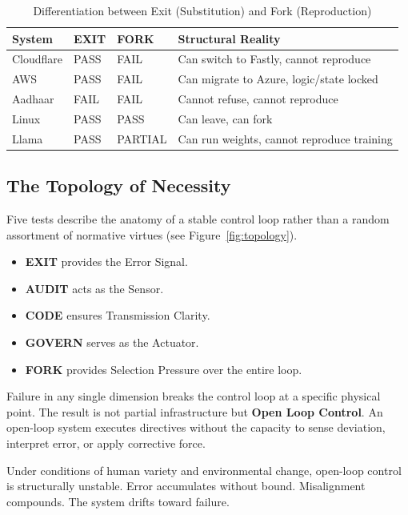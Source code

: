 \documentclass{article}
\begin{document}
\begin{table}[htbp]
\centering
\begin{tabular}{@{}lllp{5.5cm}@{}}
\toprule
\textbf{System} & \textbf{EXIT} & \textbf{FORK} & \textbf{Structural Reality} \\
\midrule
Cloudflare & PASS & FAIL & Can switch to Fastly, cannot reproduce \\
AWS & PASS & FAIL & Can migrate to Azure, logic/state locked \\
Aadhaar & FAIL & FAIL & Cannot refuse, cannot reproduce \\
Linux & PASS & PASS & Can leave, can fork \\
Llama & PASS & PARTIAL & Can run weights, cannot reproduce training \\
\bottomrule
\end{tabular}
\caption{Differentiation between Exit (Substitution) and Fork (Reproduction)}
\end{table}

\subsection{The Topology of Necessity}

Five tests describe the anatomy of a stable control loop rather than a random assortment of normative virtues (see Figure~\ref{fig:topology}).

\begin{itemize}[noitemsep,topsep=0pt]
    \item \textbf{EXIT} provides the Error Signal.
    \item \textbf{AUDIT} acts as the Sensor.
    \item \textbf{CODE} ensures Transmission Clarity.
    \item \textbf{GOVERN} serves as the Actuator.
    \item \textbf{FORK} provides Selection Pressure over the entire loop.
\end{itemize}

Failure in any single dimension breaks the control loop at a specific physical point. The result is not partial infrastructure but \textbf{Open Loop Control}. An open-loop system executes directives without the capacity to sense deviation, interpret error, or apply corrective force.

Under conditions of human variety and environmental change, open-loop control is structurally unstable. Error accumulates without bound. Misalignment compounds. The system drifts toward failure.
\end{document}
